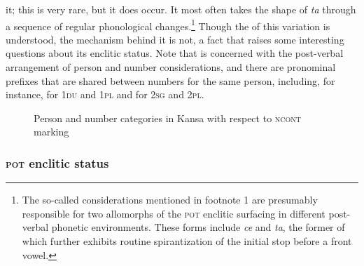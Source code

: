 \documentclass[output=paper]{LSP/langsci}
\begin{document}
it; this is very rare, but it does occur. It most often takes the shape of \textit{ta} through a sequence of regular phonological changes.\footnote{The so-called  considerations mentioned in footnote 1 are presumably responsible for two allomorphs of the \textsc{pot} enclitic surfacing in different post-verbal phonetic environments. These forms include \textit{ce} and \textit{ta}, the former of which further exhibits routine spirantization of the initial stop before a front vowel.} Though the  of this variation is understood, the mechanism behind it is not, a fact that raises some interesting questions about its enclitic status. Note that  is concerned with the post-verbal arrangement of person and number considerations, and there are pronominal prefixes that are shared between numbers for the same person, including, for instance, for \textsc{1du} and \textsc{1pl} and for \textsc{2sg} and \textsc{2pl}.

\begin{figure}
\caption{Person and number categories in Kansa with respect to \textsc{ncont} marking} \label{ncont}

\begin{center}
\end{center}
\end{figure}

\subsubsection{\textsc{pot} enclitic status}
\end{document}
